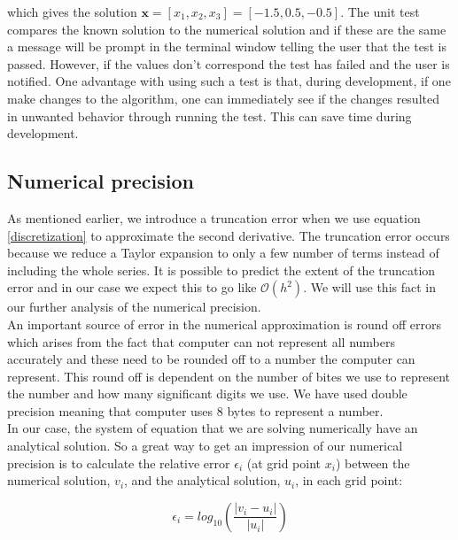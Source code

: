 \documentclass[12pt]{article}
\numberwithin{figure}{section}
\numberwithin{table}{section}
\begin{document}
\noindent which gives the solution $\mathbf{x}=[x_1, x_2, x_3]=[-1.5, 0.5, -0.5]$. The unit test compares the known solution to the numerical solution and if these are the same a message will be prompt in the terminal window telling the user that the test is passed. However, if the values don't correspond the test has failed and the user is notified. One advantage with using such a test is that, during development, if one make changes to the algorithm, one can immediately see if the changes resulted in unwanted behavior through running the test. This can save time during development. \\

\subsection{Numerical precision} \label{sec:numprec}

\noindent As mentioned earlier, we introduce a truncation error when we use equation \eqref{discretization} to approximate the second derivative. The truncation error occurs because we reduce a Taylor expansion to only a few number of terms instead of including the whole series. It is possible to predict the extent of the truncation error and in our case we expect this to go like $\mathcal{O}(h^2)$. We will use this fact in our further analysis of the numerical precision.  \\

\noindent An important source of error in the numerical approximation is round off errors which arises from the fact that computer can not represent all numbers accurately and these need to be rounded off to a number the computer can represent. This round off is dependent on the number of bites we use to represent the number and how many significant digits we use. We have used double precision meaning that computer uses 8 bytes to represent a number. \\

\noindent In our case, the system of equation that we are solving numerically have an analytical solution. So a great way to get an impression of our numerical precision is to calculate the relative error $\epsilon_i$ (at grid point $x_i$) between the numerical solution, $v_i$, and the analytical solution, $u_i$, in each grid point:

\begin{equation}
\label{RelErr}
 \epsilon_i = log_{10} \left(\frac{|v_i - u_i|}{|u_i|}\right)
\end{equation}
\end{document}
